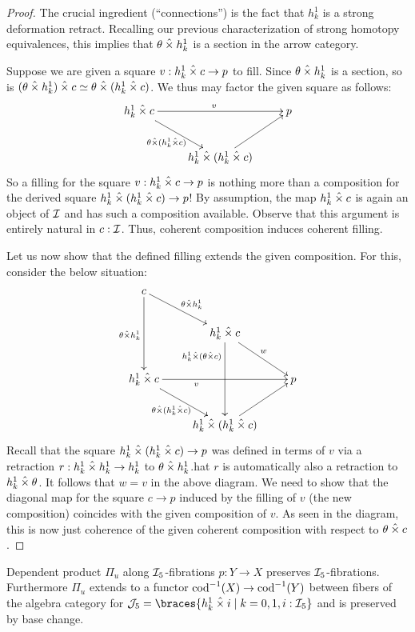 \documentclass[reqno,10pt,a4paper,oneside]{amsart}
\begin{document}
\begin{proof}
The crucial ingredient (``connections'') is the fact that $h_k^1$ is a strong deformation retract.
Recalling our previous characterization of strong homotopy equivalences, this implies that $\theta \hattimes h_k^1$ is a section in the arrow category.

Suppose we are given a square $v : h_k^1 \hattimes c \to p$ to fill.
Since $\theta \hattimes h_k^1$ is a section, so is $(\theta \hattimes h_k^1) \hattimes c \simeq \theta \hattimes (h_k^1 \hattimes c)$.
We thus may factor the given square as follows:
\[
\xymatrix{
  h_k^1 \hattimes c
  \ar[rr]^{v}
  \ar[dr]_{\theta \hattimes (h_k^1 \hattimes c)}
&&
  p
\\&
  h_k^1 \hattimes (h_k^1 \hattimes c)
  \ar[ur]
}
\]
So a filling for the square $v : h_k^1 \hattimes c \to p$ is nothing more than a composition for the derived square $h_k^1 \hattimes (h_k^1 \hattimes c) \to p$!
By assumption, the map $h_k^1 \hattimes c$ is again an object of $\cal{I}$ and has such a composition available.
Observe that this argument is entirely natural in $c : \cal{I}$.
Thus, coherent composition induces coherent filling.

Let us now show that the defined filling extends the given composition.
For this, consider the below situation:
\[
\xymatrix{
  c
  \ar[dr]^{\theta \hattimes h_k^1}
  \ar[dd]_{\theta \hattimes h_k^1}
\\&
  h_k^1 \hattimes c
  \ar[dd]_(0.25){h_k^1 \hattimes (\theta \hattimes c)}
  \ar[dr]^{w}
\\
  h_k^1 \hattimes c
  \ar[rr]_(0.35){v}
  \ar[dr]_{\theta \hattimes (h_k^1 \hattimes c)}
&&
  p
\\&
  h_k^1 \hattimes (h_k^1 \hattimes c)
  \ar[ur]
}
\]
Recall that the square $h_k^1 \hattimes (h_k^1 \hattimes c) \to p$ was defined in terms of $v$ via a retraction $r : h_k^1 \hattimes h_k^1 \to h_k^1$ to $\theta \hattimes h_k^1$.hat $r$ is automatically also a retraction to $h_k^1 \hattimes \theta$.
It follows that $w = v$ in the above diagram.
We need to show that the diagonal map for the square $c \to p$ induced by the filling of $v$ (the new composition) coincides with the given composition of $v$.
As seen in the diagram, this is now just coherence of the given coherent composition with respect to $\theta \hattimes c$.
\end{proof}

\begin{lemma}
Dependent product $\Pi_u$ along $\cal{I}_5$-fibrations $p : Y \to X$ preserves $\cal{I}_5$-fibrations.
Furthermore $\Pi_u$ extends to a functor $\cod^{-1}(X) \to \cod^{-1}(Y)$ between fibers of the algebra category for $\cal{J}_5 = \braces{h_k^1 \hattimes i \mid k = 0, 1, i : \cal{I}_5}$ and is preserved by base change.
\end{lemma}
\end{document}
